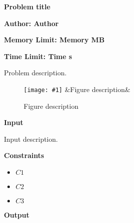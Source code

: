 \documentclass{article}
\newenvironment{ConstraintList}
{
	\vspace{-2mm}
	\begin{itemize}
}
{
	\end{itemize}
}
\newcommand{\englishProblemHeader}[4]{
	\begin{center} {\huge \sf \bfseries #1} \end{center}
	\vspace{-2mm}
	\centerline{\sf \bfseries Author: #2}
	\vspace{1mm}
	\centerline{\sf \bfseries Memory Limit: #3}
	\vspace{1mm}
	\centerline{\sf \bfseries Time Limit: #4}
	\vspace{10mm}
}
\newcommand{\printSubtitle}[1]{
	\vspace{1mm}
	\begin{flushleft} {\Large \sf \bfseries #1 \newline} \end{flushleft}
	\vspace{-4mm}
}
\newcommand{\image}[4]{
	\begin{figure}[h]
		\centering
		\texttt{[image: \#1]}
		\ifx&#4&\empty
		\else
			\caption{#4}
		\fi
	\end{figure}
}
\begin{document}


\englishProblemHeader{Problem title}{Author}{Memory MB}{Time s}




Problem description.
\newline

\image{images/figure-1.png}{9.6cm}{8cm}{Figure description}




\printSubtitle{Input}

Input description.
\newline




\printSubtitle{Constraints}

\begin{ConstraintList}
	\item $ C1 $
	\item $ C2 $
	\item $ C3 $
\end{ConstraintList}




\printSubtitle{Output}
\end{document}
